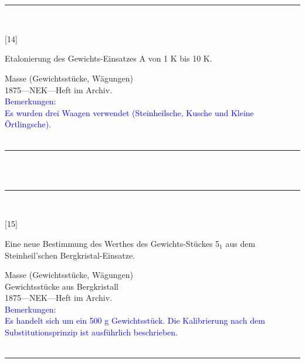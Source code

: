 \\
\vspace*{-2.5pt}\\
\parbox{\textwidth}{%
\rule{\textwidth}{1pt}\vspace*{-3mm}\\
\begin{minipage}[t]{0.15\textwidth}\vspace{0pt}
\Huge\rule[-4mm]{0cm}{1cm}[14]
\end{minipage}
\hfill
\begin{minipage}[t]{0.85\textwidth}\vspace{0pt}
\large Etalonierung des Gewichts-Einsatzes {\glqq}A{\grqq} von 1 K bis 10 K.\rule[-2mm]{0mm}{2mm}
\end{minipage}
{\footnotesize\flushright
Masse (Gewichtsstücke, Wägungen)\\
}
1875\quad---\quad NEK\quad---\quad Heft im Archiv.\\
\textcolor{blue}{Bemerkungen:\\{}
Es wurden drei Waagen verwendet (Steinheilsche, Kusche und Kleine Örtlingsche).\\{}
}
\\[-15pt]
\rule{\textwidth}{1pt}
}
\\
\vspace*{-2.5pt}\\
\parbox{\textwidth}{%
\rule{\textwidth}{1pt}\vspace*{-3mm}\\
\begin{minipage}[t]{0.15\textwidth}\vspace{0pt}
\Huge\rule[-4mm]{0cm}{1cm}[15]
\end{minipage}
\hfill
\begin{minipage}[t]{0.85\textwidth}\vspace{0pt}
\large Eine neue Bestimmung des Werthes des Gewichts-Stückes {\glqq}5$_\mathrm{1}${\grqq} aus dem Steinheil'schen Bergkristal-Einsatze.\rule[-2mm]{0mm}{2mm}
\end{minipage}
{\footnotesize\flushright
Masse (Gewichtsstücke, Wägungen)\\
Gewichtsstücke aus Bergkristall\\
}
1875\quad---\quad NEK\quad---\quad Heft im Archiv.\\
\textcolor{blue}{Bemerkungen:\\{}
Es handelt sich um ein 500 g Gewichtsstück. Die Kalibrierung nach dem Substitutionsprinzip ist ausführlich beschrieben.\\{}
}
\\[-15pt]
\rule{\textwidth}{1pt}
}
